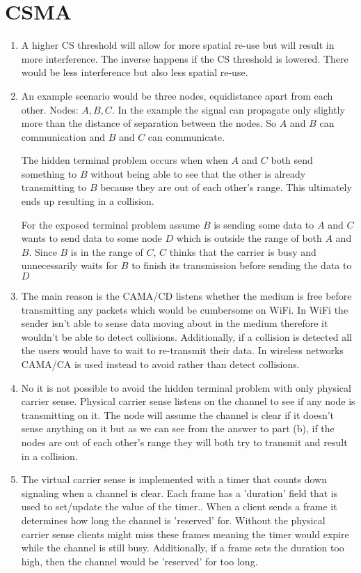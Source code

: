 \documentclass[11pt]{article}
\begin{document}
\section{CSMA}
\begin{enumerate}[label=(\alph*)]
\item {
	A higher CS threshold will allow for more spatial re-use but will result in more interference. The inverse happens if 
	the CS threshold is lowered. There would be less interference but also less spatial re-use.
}
\item {
	An example scenario would be three nodes, equidistance apart from each other. Nodes: $A, B, C$. 
	In the example the signal can propagate only slightly more than the distance of separation between the nodes. 
	So $A$ and $B$ can communication and $B$ and $C$ can communicate.
	
	The hidden terminal problem occurs when when $A$ and $C$ both send something to $B$ without being able 
	to see that the other is already transmitting to $B$ because they are out of each other's range. This ultimately 
	ends up resulting in a collision. 
	
	For the exposed terminal problem assume $B$ is sending some data to $A$ and $C$ wants to send data to 
	some node $D$ which is outside the range of both $A$ and $B$. Since $B$ is in the range of $C$, $C$ thinks
	that the carrier is busy and unnecessarily waits for $B$ to finish its transmission before sending the data to $D$
}
\item {
	The main reason is the CAMA/CD listens whether the medium is free before transmitting any packets which
	would be cumbersome on WiFi. In WiFi the sender isn't able to sense data moving about in the medium therefore
	it wouldn't be able to detect collisions. Additionally, if a collision is detected all the users would have to wait to
	re-transmit their data. In wireless networks CAMA/CA is used instead to avoid rather than detect collisions.
}
\item {
	No it is not possible to avoid the hidden terminal problem with only physical carrier sense. Physical carrier sense 
	listens on the channel to see if any node is transmitting on it. The node will assume the channel is clear if it doesn't 
	sense anything on it but as we can see from the answer to part (b), if the nodes are out of each other's range they 
	will both try to transmit and result in a collision.
}	
\item {
	The virtual carrier sense is implemented with a timer that counts down signaling when a channel is clear. Each 
	frame has a 'duration' field that is used to set/update the value of the timer.. When a client sends a frame it 
	determines how long the channel is 'reserved' for. Without the physical carrier sense clients might miss these frames
	meaning the timer would expire while the channel is still busy. Additionally, if a frame sets the duration too high, then the 
	channel would be 'reserved' for too long.
}
\end{enumerate}
\end{document}
